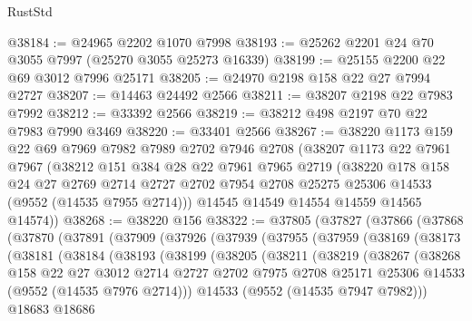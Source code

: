 \begin{lexlean}{RustStd}
\begin{coremodule}
@38184 := @24965 @2202 @1070 @7998
@38193 := @25262 @2201 @24 @70 @3055 @7997 (@25270 @3055 @25273 @16339)
@38199 := @25155 @2200 @22 @69 @3012 @7996 @25171
@38205 := @24970 @2198 @158 @22 @27 @7994 @2727
@38207 := @14463 @24492 @2566
@38211 := @38207 @2198 @22 @7983 @7992
@38212 := @33392 @2566
@38219 := @38212 @498 @2197 @70 @22 @7983 @7990 @3469
@38220 := @33401 @2566
@38267 := @38220
    @1173
    @159
    @22
    @69
    @7969
    @7982
    @7989
    @2702
    @7946
    @2708
    (@38207
      @1173
      @22
      @7961
      @7967
      (@38212
        @151
        @384
        @28
        @22
        @7961
        @7965
        @2719
        (@38220
          @178
          @158
          @24
          @27
          @2769
          @2714
          @2727
          @2702
          @7954
          @2708
          @25275
          @25306
          @14533
          (@9552 (@14535 @7955 @2714)))
        @14545
        @14549
        @14554
        @14559
        @14565
        @14574))
@38268 := @38220 @156
@38322 := @37805
    (@37827
      (@37866
        (@37868
          (@37870
            (@37891
              (@37909
                (@37926
                  (@37939
                    (@37955
                      (@37959
                        (@38169
                          (@38173
                            (@38181
                              (@38184
                                (@38193
                                  (@38199
                                    (@38205
                                      (@38211
                                        (@38219
                                          (@38267
                                            (@38268
                                              @158
                                              @22
                                              @27
                                              @3012
                                              @2714
                                              @2727
                                              @2702
                                              @7975
                                              @2708
                                              @25171
                                              @25306
                                              @14533
                                              (@9552 (@14535 @7976 @2714)))
                                            @14533
                                            (@9552 (@14535 @7947 @7982)))
                                          @18683
                                          @18686

\end{coremodule}
\end{lexlean}
